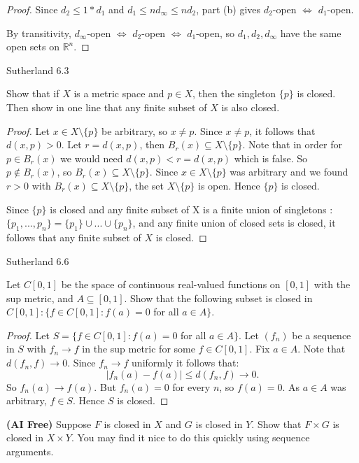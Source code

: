 \documentclass[minion]{homework}
\newcommand{\Reals}{\ensuremath{\mathbb R}}%
\begin{document}
\begin{problems}
\begin{proof}
  Since $d_2 \leq 1 * d_1$ and $d_1 \leq nd_\infty \leq nd_2$, part (b) gives $d_2$-open $\iff$ $d_1$-open.

  By transitivity, $d_\infty$-open $\iff$ $d_2$-open $\iff$ $d_1$-open, so $d_1,d_2,d_\infty$ have the same open sets on $\Reals^n$.
\end{proof}
\problem Sutherland 6.3 

Show that if $X$ is a metric space and $p\in X$, then the singleton $\{p\}$ is closed.
Then show in one line that any finite subset of $X$ is also closed. \newline
\begin{proof}
  Let $x \in X \setminus \{p\}$ be arbitrary, so $x \neq p$. Since $x \neq p$, it follows that $d(x,p) > 0$. Let $r = d(x,p)$, then $B_r(x) \subseteq X \setminus \{p\}.$ Note that in order for $p \in B_r(x)$ we would need $d(x,p) < r = d(x,p)$ which is false. So $p \notin B_r(x)$, so $B_r(x) \subseteq X \setminus \{p\}.$ Since $x \in X \setminus \{p\}$ was arbitrary and we found $r > 0$ with $B_r(x) \subseteq X \setminus \{p\}$, the set $X \setminus \{p\}$ is open. Hence $\{p\}$ is closed.

Since $\{p\}$ is closed and any finite subset of X is a finite union of singletons : $\{p_1,...,p_n\} = \{p_1\}\cup...\cup\{p_n\}$, and any finite union of closed sets is closed, it follows that any finite subset of $X$ is closed.

\end{proof}

\problem Sutherland 6.6

Let $C[0, 1]$ be the space of continuous real-valued functions on
$[0, 1]$ with the sup metric, and $A \subseteq [0, 1]$. Show that the following subset is
closed in $C[0, 1]: \{f \in C[0, 1] : f(a) = 0$ for all $a \in A\}$. \newline


\begin{proof}
  Let $S = \{f \in C[0,1] : f(a) = 0$ for all $a \in A\}$. Let $(f_n)$ be a sequence in $S$ with $f_n \to f$ in the sup metric for some $f \in C[0,1].$
  Fix $a \in A$. Note that $d(f_n,f) \to 0$. Since $f_n \to f$ uniformly it follows that:
  $$|f_n(a) - f(a)| \leq d(f_n,f) \to 0.$$
  So $f_n(a) \to f(a).$ But $f_n(a) = 0$ for every $n$, so $f(a) = 0$. As $a \in A$ was arbitrary, $f \in S$. Hence $S$ is closed.
\end{proof}

\problem \textbf{(AI Free)} Suppose $F$ is closed in $X$ and $G$ is closed in $Y$.  Show 
that $F\times G$ is closed in $X \times Y$.  You may find it nice to
do this quickly using sequence arguments. \newline


\end{problems}
\end{document}
